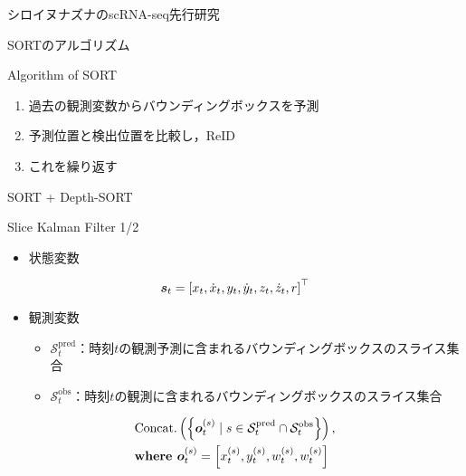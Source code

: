 \begin{frame}[noframenumbering]{シロイヌナズナのscRNA-seq先行研究}
\end{frame}

\begin{frame}[noframenumbering]{SORTのアルゴリズム}
    \begin{block}{Algorithm of SORT}
        \begin{enumerate}
            \item 過去の観測変数からバウンディングボックスを予測
            \item 予測位置と検出位置を比較し，ReID
            \item これを繰り返す
        \end{enumerate}        
    \end{block}
\end{frame}

\begin{frame}[noframenumbering]{SORT + Depth-SORT}
\end{frame}

\begin{frame}[noframenumbering]{Slice Kalman Filter 1/2}
    \begin{itemize}
        \item 状態変数
    \end{itemize}
    \begin{equation}
        \notag
        \bm{s}_t = \left[x_t ,\dot{x}_t, y_t, \dot{y}_t, z_t, \dot{z}_t, r\right]^{\top}
    \end{equation}
    \begin{itemize}
        \item 観測変数
        \begin{itemize}
            \item $\mathcal{S}_t^{\text{pred}}$：時刻$t$の観測予測に含まれるバウンディングボックスのスライス集合
            \item $\mathcal{S}_t^{\text{obs}}$：時刻$t$の観測に含まれるバウンディングボックスのスライス集合
        \end{itemize}
    \end{itemize}
    \vspace{0.5zh}
    \begin{equation}
        \notag
        \begin{aligned}
            &\text{Concat.}\left(\left\{
                \bm{o}_t^{(s)} \mid s \in \mathcal{S}_t^{\text{pred}} \cap \mathcal{S}_t^{\text{obs}}
            \right\}\right),
            \\ & \textbf{where } \bm{o}_t^{(s)} = \left[x_t^{(s)}, y_t^{(s)}, w_t^{(s)}, w_t^{(s)}\right]
        \end{aligned}
    \end{equation}
\end{frame}


